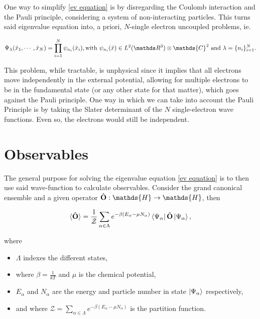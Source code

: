 \documentclass{homework}
\begin{document}
One way to simplify \eqref{ev equation} is by disregarding the Coulomb interaction and the Pauli principle, considering a system of non-interacting particles. This turns said eigenvalue equation into, a priori, $N$-single electron uncoupled problems, ie.

$$
\Psi_\lambda(\tilde{x}_1, \cdots, \tilde{x}_N) = \prod_{i=1}^{N} \psi_{n_i}(\tilde{x}_i), \textnormal{with } \psi_{n_i}(\tilde{x}) \in L^2(\R^{3}) \otimes \mathds{C}^2 \textnormal{ and } \lambda = \{n_i\}_{i=1}^{N}.
$$

This problem, while tractable, is unphysical since it implies that all electrons move independently in the external potential, allowing for multiple electrons to be in the fundamental state (or any other state for that matter), which goes against the Pauli principle. One way in which we can take into account the Pauli Principle is by taking the Slater determinant of the $N$ single-electron wave functions. Even so, the electrons would still be independent. \\

\section{Observables}

The general purpose for solving the eigenvalue equation \eqref{ev equation} is to then use said wave-function to calculate observables. Consider the grand canonical ensemble and a given operator $\hat{\bf O} : \mathds{H} \rightarrow \mathds{H}$, then 

\begin{equation}
\langle \hat{\bf O} \rangle = \frac{1}{\mathcal{Z}} \sum_{\alpha \in \Lambda} e^{-\beta(E_\alpha - \mu N_\alpha)} \bra{\Psi_\alpha}\hat{\bf O}\ket{\Psi_\alpha},
\label{grand canonical}
\end{equation}

where 

\begin{itemize}
    \item $\Lambda$ indexes the different states,
    \item where $\beta = \frac{1}{kT}$ and $\mu$ is the chemical potential,
    \item $E_\alpha$ and $N_\alpha$ are the energy and particle number in state $\ket{\Psi_\alpha}$ respectively,
    \item and where $\mathcal{Z} =  \sum_{\alpha \in \Lambda} e^{-\beta(E_{\alpha} - \mu N_{\alpha})}$ is the partition function. 
\end{itemize}
\end{document}
